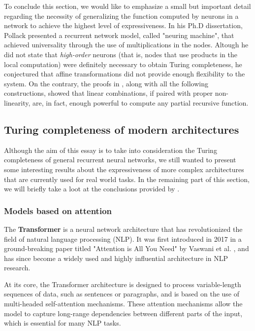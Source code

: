 \documentclass{article}
\begin{document}
To conclude this section, we would like to emphasize a small but important detail regarding the necessity of generalizing the function computed by neurons in a network to achieve the highest level of expressiveness. In his Ph.D dissertation, Pollack \cite{POL87} presented a recurrent network model, called "neuring machine", that achieved universality through the use of multiplications in the nodes. Altough he did not state that \textit{high-order} neurons (that is, nodes that use products in the local computation) were definitely necessary to obtain Turing completeness, he conjectured that affine transformations did not provide enough flexibility to the system. On the contrary, the proofs in \cite{SIE95}, along with all the following constructions, showed that linear combinations, if paired with proper non-linearity, are, in fact, enough powerful to compute any partial recursive function.

\subsection{Turing completeness of modern architectures}

Although the aim of this essay is to take into consideration the Turing completeness of general recurrent neural networks, we still wanted to present some interesting results about the expressiveness of more complex architectures that are currently used for real world tasks. In the remaining part of this section, we will briefly take a loot at the conclusions provided by \cite{PER19}.

\subsubsection{Models based on attention}
The \textbf{Transformer} is a neural network architecture that has revolutionized the field of natural language processing (NLP). It was first introduced in 2017 in a ground-breaking paper titled "Attention is All You Need" by Vaswani et al. \cite{VAS17}, and has since become a widely used and highly influential architecture in NLP research.

At its core, the Transformer architecture is designed to process variable-length sequences of data, such as sentences or paragraphs, and is based on the use of multi-headed self-attention mechanisms. These attention mechanisms allow the model to capture long-range dependencies between different parts of the input, which is essential for many NLP tasks.
\end{document}
